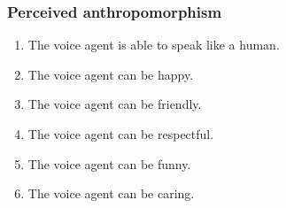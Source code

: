 \subsubsection*{Perceived anthropomorphism}
\begin{enumerate}
\item[Q37.] \begin{minipage}[t]{\linewidth}
The voice agent is able to speak like a human.
\end{minipage}
\item[Q38.] \begin{minipage}[t]{\linewidth}
The voice agent can be happy.
\end{minipage}
\item[Q39.] \begin{minipage}[t]{\linewidth}
The voice agent can be friendly.
\end{minipage}
\item[Q40.] \begin{minipage}[t]{\linewidth}
The voice agent can be respectful.
\end{minipage}
\item[Q41.] \begin{minipage}[t]{\linewidth}
The voice agent can be funny.
\end{minipage}
\item[Q42.] \begin{minipage}[t]{\linewidth}
The voice agent can be caring.
\end{minipage}
\end{enumerate}
